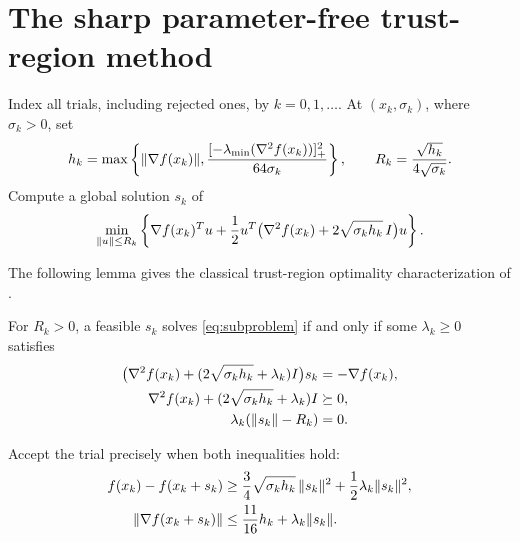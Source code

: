 \section{The sharp parameter-free trust-region method}
\label{sec:algorithm}
Index all trials, including rejected ones, by $k=0,1,\ldots$.
At $(x_k,\sigma_k)$, where $\sigma_k>0$, set
\begin{equation}\label{eq:model-scales}
 h_k=\max\left\{\lVert\nabla f(x_k)\rVert,
       \frac{[-\lambda_{\min}(\nabla^2 f(x_k))]_+^2}{64\sigma_k}\right\},
 \qquad R_k=\frac{\sqrt{h_k}}{4\sqrt{\sigma_k}}.
\end{equation}
Compute a global solution $s_k$ of
\begin{equation}\label{eq:subproblem}
 \min_{\lVert u\rVert\le R_k}\left\{\nabla f(x_k)^Tu+
       \frac12u^T\bigl(\nabla^2 f(x_k)+2\sqrt{\sigma_kh_k}\,I\bigr)u\right\}.
\end{equation}

The following lemma gives the classical trust-region optimality
characterization of \citet[Theorem~4.1]{nocedal2006numerical}.
\begin{lemma}\label{lem:trs}
For $R_k>0$, a feasible $s_k$ solves \eqref{eq:subproblem} if and
only if some $\lambda_k\ge0$ satisfies
\begin{align}
 \bigl(\nabla^2 f(x_k)+(2\sqrt{\sigma_kh_k}+\lambda_k)I\bigr)s_k
    &=-\nabla f(x_k),\label{eq:kkt-stationarity}\\
 \nabla^2 f(x_k)+(2\sqrt{\sigma_kh_k}+\lambda_k)I
    &\succeq0,\label{eq:kkt-psd}\\
 \lambda_k(\lVert s_k\rVert-R_k)&=0.\label{eq:kkt-complementarity}
\end{align}
\end{lemma}


\begin{samepage}
Accept the trial precisely when both inequalities hold:
\begin{align}
 f(x_k)-f(x_k+s_k)
 &\ge\frac34\sqrt{\sigma_kh_k}\,\lVert s_k\rVert^2
             +\frac12\lambda_k\lVert s_k\rVert^2,
                                      \label{eq:accept-value}\\*
 \lVert\nabla f(x_k+s_k)\rVert
 &\le\frac{11}{16}h_k+\lambda_k\lVert s_k\rVert.
                                      \label{eq:accept-gradient}
\end{align}
\end{samepage}

\begin{algorithm}[H]
\DontPrintSemicolon
\caption{Curvature-scaled parameter-free UTR}
\label{alg:utr}
\end{algorithm}

